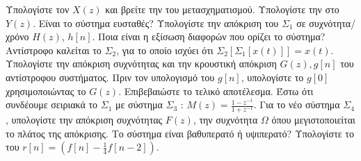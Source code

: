 \documentclass{assignment}
\begin{document}
\begin{questions}

 Υπολογίστε τον $X(z)$ και βρείτε την  του μετασχηματισμού.
 Υπολογίστε την  στο $Y(z)$. Είναι το σύστημα ευσταθές?
 Υπολογίστε την απόκριση του $\Sigma_1$ σε συχνότητα/χρόνο $H(z)$, $h[n]$.
 Ποια είναι η εξίσωση διαφορών που ορίζει το σύστημα?
 Αντίστροφο καλείται το $\Sigma_2$, για το οποίο ισχύει ότι $\Sigma_2[\Sigma_1[x(t)]] = x(t)$. 
Υπολογίστε την απόκριση συχνότητας και την κρουστική απόκριση $G(z),g[n]$ του αντίστροφου συστήματος. Πριν τον 
υπολογισμό του $g[n]$, υπολογίστε το $g[0]$ χρησιμοποιώντας το $G(z)$. Επιβεβαιώστε το τελικό αποτέλεσμα.
 Έστω ότι συνδέουμε σειριακά το $\Sigma_1$ με σύστημα $\Sigma_3$ : $M(z) = \frac{1-z^{-1}}{1+z^{-1}}$. 
Για το νέο σύστημα $\Sigma_4$, υπολογίστε την απόκριση συχνότητας $F(z)$, την συχνότητα $\Omega$ όπου μεγιστοποιείται 
το πλάτος της απόκρισης. Το σύστημα είναι βαθυπερατό ή υψιπερατό?
 Υπολογίστε το  του $r[n] = (f[n] - \frac{1}{4}f[n-2])$.

\end{questions}

\solution
\end{document}
